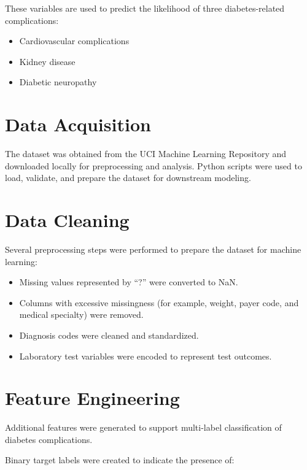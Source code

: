 \documentclass[12pt]{article}
\begin{document}
These variables are used to predict the likelihood of three diabetes-related complications:

\begin{itemize}
\item Cardiovascular complications
\item Kidney disease
\item Diabetic neuropathy
\end{itemize}


\section{Data Acquisition}

The dataset was obtained from the UCI Machine Learning Repository and downloaded locally for preprocessing and analysis. Python scripts were used to load, validate, and prepare the dataset for downstream modeling.


\section{Data Cleaning}

Several preprocessing steps were performed to prepare the dataset for machine learning:

\begin{itemize}
\item Missing values represented by ``?'' were converted to NaN.
\item Columns with excessive missingness (for example, weight, payer code, and medical specialty) were removed.
\item Diagnosis codes were cleaned and standardized.
\item Laboratory test variables were encoded to represent test outcomes.
\end{itemize}


\section{Feature Engineering}

Additional features were generated to support multi-label classification of diabetes complications.

Binary target labels were created to indicate the presence of:
\end{document}
